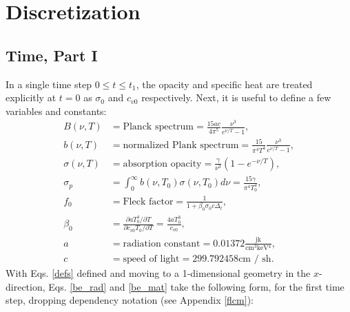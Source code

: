 \section{Discretization}
\subsection{Time, Part I}
In a single time step $0\leq t\leq t_1$, the opacity and specific heat are
treated explicitly at $t=0$ as $\sigma_0$ and $c_{v0}$ respectively.  Next, it
is useful
to define a few variables and constants:
\begin{subequations}\label{defs}
\begin{align}
B(\nu,T) & =\mbox{Planck spectrum}
  =\frac{15ac}{4\pi^5}\frac{\nu^3}{e^{\nu/T}-1},\\
b(\nu,T) & =\mbox{normalized Plank spectrum}
  =\frac{15}{\pi^4T^4} \frac{\nu^3}{e^{\nu/T}-1}, \\
\sigma(\nu,T) & =\mbox{absorption opacity}=\frac{\gamma}{\nu^3}(1-e^{-\nu/T}),\\
\sigma_p &
  =\int_0^\infty b(\nu,T_0)\sigma(\nu,T_0)d\nu=\frac{15\gamma}{\pi^4T_0^3},\\
f_0 & =\mbox{Fleck factor}=\frac{1}{1+\beta_0\sigma_0c\Delta_t},\\
\beta_0 & =\frac{\partial aT_0^4/\partial T}{\partial
  c_{v0}T_0/\partial T}=\frac{4aT_0^3}{c_{v0}},\\
a & =\mbox{radiation constant}=0.01372 \frac{\mbox{jk}}{\mbox{cm$^3$keV$^4$}},\\
c & =\mbox{speed of light}=299.792458 \mbox{cm $/$ sh}.
\end{align}
\end{subequations}
With Eqs. \eqref{defs} defined and moving to a 1-dimensional geometry in the
$x$-direction, Eqs. \eqref{be_rad} and \eqref{be_mat} take the following
form, for the first time step, dropping dependency notation (see Appendix
\ref{flcm}):
